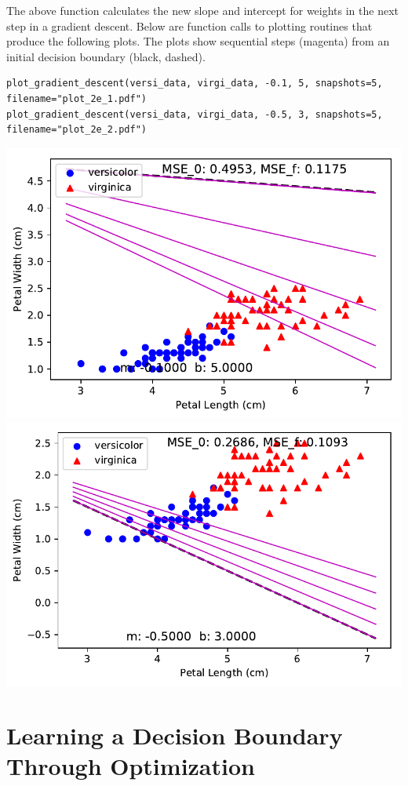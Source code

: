 \documentclass[letterpaper]{article}
\begin{document}
The above function calculates the new slope and intercept for weights in the
next step in a gradient descent. Below are function calls to plotting routines
that produce the following plots. The plots show sequential steps (magenta)
from an initial decision boundary (black, dashed).

\begin{verbatim}
plot_gradient_descent(versi_data, virgi_data, -0.1, 5, snapshots=5, filename="plot_2e_1.pdf")
plot_gradient_descent(versi_data, virgi_data, -0.5, 3, snapshots=5, filename="plot_2e_2.pdf")
\end{verbatim}
\begin{center}
\includegraphics{plot_2e_1.pdf}
\includegraphics{plot_2e_2.pdf}
\end{center}

\section{Learning a Decision Boundary Through Optimization}
\end{document}
